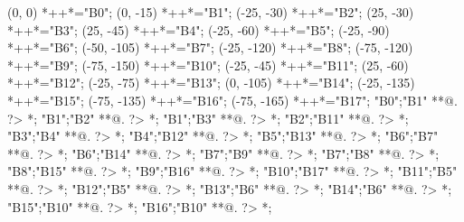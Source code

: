 \begin{scriptsize}
\xy(0, 0)
	*++{}*\frm{-,}="B0";
(0, -15)
	*++{}*\frm{-,}="B1";
(-25, -30)
	*++{}*\frm{-,}="B2";
(25, -30)
	*++{}*\frm{-,}="B3";
(25, -45)
	*++{}*\frm{-,}="B4";
(-25, -60)
	*++{}*\frm{-,}="B5";
(-25, -90)
	*++{}*\frm{-,}="B6";
(-50, -105)
	*++{}*\frm{-,}="B7";
(-25, -120)
	*++{}*\frm{-,}="B8";
(-75, -120)
	*++{}*\frm{-,}="B9";
(-75, -150)
	*++{}*\frm{-,}="B10";
(-25, -45)
	*++{}*\frm{-,}="B11";
(25, -60)
	*++{}*\frm{-,}="B12";
(-25, -75)
	*++{}*\frm{-,}="B13";
(0, -105)
	*++{}*\frm{-,}="B14";
(-25, -135)
	*++{}*\frm{-,}="B15";
(-75, -135)
	*++{}*\frm{-,}="B16";
(-75, -165)
	*++{}*\frm{-,}="B17";
"B0";"B1" **@{.} ?> *{\dir{>}};
"B1";"B2" **@{.} ?> *{\dir{>}};
"B1";"B3" **@{.} ?> *{\dir{>}};
"B2";"B11" **@{.} ?> *{\dir{>}};
"B3";"B4" **@{.} ?> *{\dir{>}};
"B4";"B12" **@{.} ?> *{\dir{>}};
"B5";"B13" **@{.} ?> *{\dir{>}};
"B6";"B7" **@{.} ?> *{\dir{>}};
"B6";"B14" **@{.} ?> *{\dir{>}};
"B7";"B9" **@{.} ?> *{\dir{>}};
"B7";"B8" **@{.} ?> *{\dir{>}};
"B8";"B15" **@{.} ?> *{\dir{>}};
"B9";"B16" **@{.} ?> *{\dir{>}};
"B10";"B17" **@{.} ?> *{\dir{>}};
"B11";"B5" **@{.} ?> *{\dir{>}};
"B12";"B5" **@{.} ?> *{\dir{>}};
"B13";"B6" **@{.} ?> *{\dir{>}};
"B14";"B6" **@{.} ?> *{\dir{>}};
"B15";"B10" **@{.} ?> *{\dir{>}};
"B16";"B10" **@{.} ?> *{\dir{>}};
\endxy



\end{scriptsize}
